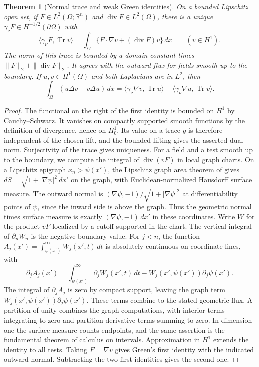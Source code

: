 \documentclass[11pt,oneside,openany]{book}
\DeclareMathOperator{\Div}{div}
\DeclareMathOperator{\Tr}{Tr}
\theoremstyle{plain}
\newtheorem{theorem}{Theorem}[chapter]
\theoremstyle{definition}
\theoremstyle{remark}
\begin{document}
\begin{theorem}[Normal trace and weak Green identities]
\label{thm:pde-normal-trace}
On a bounded Lipschitz open set, if \(F\in L^2(\Omega;\mathbb R^n)\)
and \(\Div F\in L^2(\Omega)\), there is a unique
\(\gamma_\nu F\in H^{-1/2}(\partial\Omega)\) with
\[
 \langle\gamma_\nu F,\Tr v\rangle
 =\int_\Omega\{F\cdot\nabla v+(\Div F)v\}\,dx\qquad(v\in H^1).
\]
The norm of this trace is bounded by a domain constant times
\(\|F\|_2+\|\Div F\|_2\). It agrees with the outward flux
for fields smooth up to the boundary. If \(u,v\in H^1(\Omega)\) and both Laplacians
are in \(L^2\), then
\[
 \int_\Omega(u\Delta v-v\Delta u)\,dx
   =\langle\gamma_\nu\nabla v,\Tr u\rangle
      -\langle\gamma_\nu\nabla u,\Tr v\rangle .
\]
\end{theorem}
\begin{proof}
The functional on the right of the first identity is bounded on
\(H^1\) by Cauchy--Schwarz. It vanishes on compactly supported smooth
functions by the definition of divergence, hence on \(H^1_0\).
Its value on a trace \(g\) is therefore independent of the chosen
lift, and the bounded lifting gives the asserted dual norm.
Surjectivity of the trace gives uniqueness. For a field and a test
smooth up to the boundary, we compute the integral of \(\Div(vF)\)
in local graph charts. On a Lipschitz epigraph \(x_n>\psi(x')\), the
Lipschitz graph area theorem of \cite[Theorem 4.16]{P102} gives
\(dS=\sqrt{1+|\nabla\psi|^2}\,dx'\) on the graph, with
Euclidean-normalized Hausdorff surface measure. The outward
normal is \((\nabla\psi,-1)/\sqrt{1+|\nabla\psi|^2}\) at
differentiability points of \(\psi\), since the inward side
is above the graph. Thus the geometric normal times surface
measure is exactly \((\nabla\psi,-1)\,dx'\) in these coordinates.
Write \(W\) for the product \(vF\) localized by a cutoff supported
in the chart. The vertical integral of \(\partial_nW_n\) is
the negative boundary value. For \(j<n\), the function
\(A_j(x')=\int_{\psi(x')}^\infty W_j(x',t)\,dt\) is absolutely
continuous on coordinate lines, with
\[
 \partial_j A_j(x')=\int_{\psi(x')}^\infty\partial_j W_j(x',t)\,dt
             - W_j(x',\psi(x'))\partial_j\psi(x').
\]
The integral of \(\partial_j A_j\) is zero by compact support, leaving
the graph term \(W_j(x',\psi(x'))\partial_j\psi(x')\).
These terms combine to the stated geometric flux. A partition
of unity combines the graph computations, with interior terms
integrating to zero and partition-derivative terms summing to zero.
In dimension one the surface measure counts endpoints, and the
same assertion is the fundamental theorem of calculus on intervals.
Approximation in \(H^1\)
extends the identity to all tests. Taking \(F=\nabla v\) gives
Green's first identity with the indicated outward normal.
Subtracting the two first identities gives the second one.
\end{proof}
\end{document}
